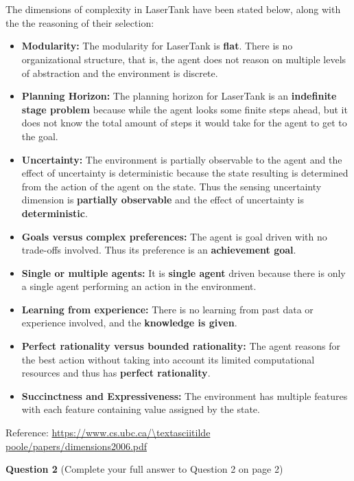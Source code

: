 \documentclass[11pt,a4paper,noindent]{article}
\begin{document}
\\ 
\noindent \\ 
The dimensions of complexity in {\sc LaserTank} have been stated below, along with the the reasoning of their selection:
\begin{itemize}
    \item \textbf{Modularity:} The modularity for {\sc LaserTank} is \textbf{flat}. There is no organizational structure, that is, the agent does not reason on multiple levels of abstraction and the environment is discrete.
    \item \textbf{Planning Horizon:} The planning horizon for {\sc LaserTank} is an \textbf{indefinite stage problem} because while the agent looks some finite steps ahead, but it does not know the total amount of steps it would take for the agent to get to the goal.
    \item \textbf{Uncertainty:} The environment is partially observable to the agent and the effect of uncertainty is deterministic because the state resulting is determined from the action of the agent on the state. Thus the sensing uncertainty dimension is \textbf{partially observable} and the effect of uncertainty is \textbf{deterministic}.
    \item \textbf{Goals versus complex preferences:} The agent is goal driven with no trade-offs involved. Thus its preference is an \textbf{achievement goal}.
    \item \textbf{Single or multiple agents:} It is \textbf{single agent} driven because there is only a single agent performing an action in the environment.
    \item \textbf{Learning from experience:} There is no learning from past data or experience involved, and the \textbf{knowledge is given}.
    \item \textbf{Perfect rationality versus bounded rationality:} The agent reasons for the best action without taking into account its limited computational resources and thus has \textbf{perfect rationality}.
    \item \textbf{Succinctness and Expressiveness:} The environment has multiple features with each feature containing value assigned by the state.
\end{itemize}
Reference: \url{https://www.cs.ubc.ca/\textasciitilde poole/papers/dimensions2006.pdf}

\newpage\noindent
\textbf{Question 2} (Complete your full answer to Question 2 on page 2)
\end{document}
